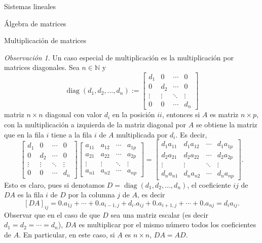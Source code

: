 \documentclass[a4paper,12pt,twoside,spanish,reqno]{amsbook}
\theoremstyle{definition}
\theoremstyle{remark}
\newtheorem{observacion}{Observaci\'on}[section]
\begin{document}
\begin{chapter}{Sistemas lineales}
\begin{section}{Álgebra de matrices}
\begin{subsection}{Multiplicación de matrices}
				\begin{observacion}\label{obs-mult-matrices-diagonales}
					Un  caso especial de multiplicación es la multiplicación por matrices diagonales. Sea $n \in \mathbb N$ y 
				\begin{equation*}
					\operatorname{diag}(d_1,d_2,\ldots,d_n) := \begin{bmatrix}
					d_1 & 0 & \cdots &0 \\
					0 & d_2 & \cdots &0 \\
					\vdots & \vdots & \ddots &\vdots \\
					0 & 0 & \cdots & d_n 
					\end{bmatrix}
				\end{equation*}
				matriz $n \times n$ diagonal con valor $d_i$  en la posición $ii$,  entonces si $A$ es matriz $n \times p$,  con la multiplicación a izquierda de la matriz diagonal por $A$  se obtiene la matriz que en la fila $i$ tiene a la fila $i$ de $A$ multiplicada por $d_i$.  Es decir,
				\begin{equation*}
				\begin{bmatrix}
				d_1 & 0 & \cdots &0 \\
				0 & d_2 & \cdots &0 \\
				\vdots & \vdots & \ddots &\vdots \\
				0 & 0 & \cdots & d_n 
				\end{bmatrix}
				\begin{bmatrix}
				a_{11} & a_{12} & \cdots &a_{1p} \\
				a_{21} & a_{22} & \cdots &a_{2p}\\
				\vdots & \vdots & \ddots &\vdots \\
				a_{n1} & a_{n2} & \cdots & a_{np} 
				\end{bmatrix}
				=
				\begin{bmatrix}
				d_1a_{11} & d_1a_{12} & \cdots &d_1a_{1p} \\
				d_2a_{21} & d_2a_{22} & \cdots &d_2a_{2p}\\
				\vdots & \vdots & \ddots &\vdots \\
				d_n a_{n1} & d_n a_{n2} & \cdots & d_n a_{np} 
				\end{bmatrix}.
				\end{equation*}
				Esto es claro, pues si denotamos $D = \operatorname{diag}(d_1,d_2,\ldots,d_n)$, el coeficiente $ij$  de $DA$ es la fila $i$ de $D$ por la columna $j$ de $A$, es decir
				$$
				[DA]_{ij} = 0.a_{1j}+\cdots + 0.a_{i-1,j}+d_i.a_{ij}+0.a_{i+1,j}+\cdots + 0.a_{nj} = d_ia_{ij}. 
				$$
				Observar que en el caso de que $D$ sea una matriz escalar (es decir $d_1=d_2=\cdots=d_n$), $DA$ es multiplicar por el mismo número todos los coeficientes de $A$. En particular, en este caso, si $A$  es $n \times n$,  $DA = AD$.
				 

\end{observacion}
\end{subsection}
\end{section}
\end{chapter}
\end{document}
